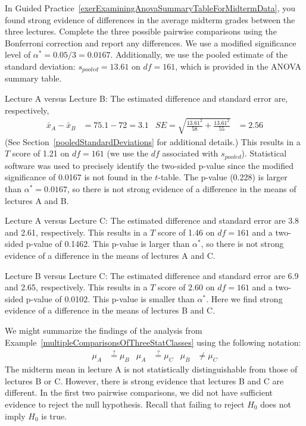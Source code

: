 \begin{example}{In Guided Practice~\ref{exerExaminingAnovaSummaryTableForMidtermData}, you found strong evidence of differences in the average midterm grades between the three lectures. Complete the three possible pairwise comparisons using the Bonferroni correction and report any differences.} \label{multipleComparisonsOfThreeStatClasses}
We use a modified significance level of $\alpha^* = 0.05/3 = 0.0167$. Additionally, we use the pooled estimate of the standard deviation: $s_{pooled}=13.61$ on $df=161$, which is provided in the ANOVA summary table.

Lecture A versus Lecture B: The estimated difference and standard error are, respectively,
\begin{align*}
\bar{x}_A - \bar{x}_{B} &= 75.1 - 72 = 3.1
	&SE = \sqrt{\frac{13.61^2}{58} + \frac{13.61^2}{55}} &= 2.56
\end{align*}
(See Section~\vref{pooledStandardDeviations} for additional details.) This results in a $T$ score of 1.21 on $df = 161$ (we use the $df$ associated with $s_{pooled}$). Statistical software was used to precisely identify the two-sided p-value since the modified significance of 0.0167 is not found in the $t$-table. The p-value (0.228) is larger than $\alpha^*=0.0167$, so there is not strong evidence of a difference in the means of lectures A and B.

Lecture A versus Lecture C: The estimated difference and standard error are 3.8 and 2.61, respectively. This results in a $T$ score of 1.46 on $df = 161$ and a two-sided p-value of 0.1462. This p-value is larger than $\alpha^*$, so there is not strong evidence of a difference in the means of lectures A and C.

Lecture B versus Lecture C: The estimated difference and standard error are 6.9 and 2.65, respectively. This results in a $T$ score of 2.60 on $df = 161$ and a two-sided p-value of 0.0102. This p-value is smaller than $\alpha^*$. Here we find strong evidence of a difference in the means of lectures B and C.
\end{example}

We might summarize the findings of the analysis from Example~\ref{multipleComparisonsOfThreeStatClasses} using the following notation:
\begin{align*}
\mu_A &\stackrel{?}{=} \mu_B
	&\mu_A &\stackrel{?}{=} \mu_C
	&\mu_B &\neq \mu_C
\end{align*}
The midterm mean in lecture A is not statistically distinguishable from those of lectures B or C. However, there is strong evidence that lectures B and C are different. In the first two pairwise comparisons, we did not have sufficient evidence to reject the null hypothesis. Recall that failing to reject $H_0$ does not imply $H_0$ is true.

